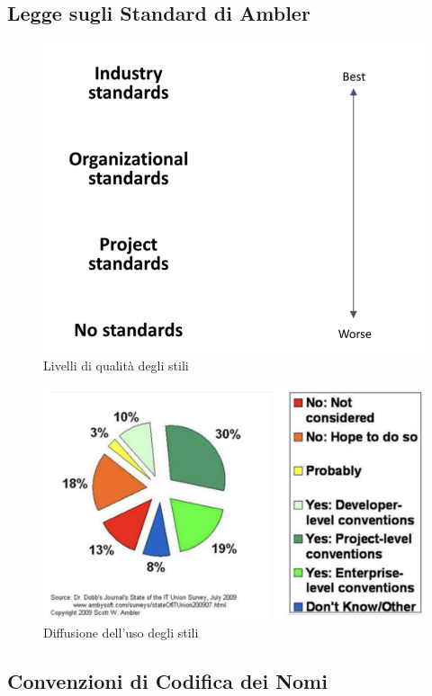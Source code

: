 \documentclass{article}
\begin{document}
	\subsection{Legge sugli Standard di Ambler}
	\begin{figure}[h]
		\centering
		\includegraphics[scale=0.3]{2.qual_stili.png}
		\caption{Livelli di qualità degli stili}
		\label{fig:im-2}
	\end{figure}
	\begin{figure}[h]
		\centering
		\includegraphics[scale=0.3]{3.diff_stili.png}
		\caption{Diffusione dell'uso degli stili}
		\label{fig:im-3}
	\end{figure}
	\subsection{Convenzioni di Codifica dei Nomi}
\end{document}
